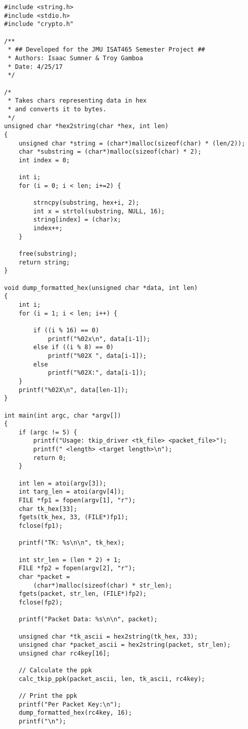 \documentclass[main.tex]{subfiles} \label{sec9}
\begin{document}
\begin{verbatim}
#include <string.h>
#include <stdio.h>
#include "crypto.h"

/**
 * ## Developed for the JMU ISAT465 Semester Project ##
 * Authors: Isaac Sumner & Troy Gamboa
 * Date: 4/25/17
 */

/*
 * Takes chars representing data in hex 
 * and converts it to bytes.
 */
unsigned char *hex2string(char *hex, int len)
{
    unsigned char *string = (char*)malloc(sizeof(char) * (len/2));
    char *substring = (char*)malloc(sizeof(char) * 2);
    int index = 0;

    int i;
    for (i = 0; i < len; i+=2) {
        
        strncpy(substring, hex+i, 2);
        int x = strtol(substring, NULL, 16);
        string[index] = (char)x;
        index++;
    }
    
    free(substring);
    return string;
}

void dump_formatted_hex(unsigned char *data, int len)
{
    int i;
    for (i = 1; i < len; i++) {
        
        if ((i % 16) == 0)
            printf("%02x\n", data[i-1]);
        else if ((i % 8) == 0)
            printf("%02X ", data[i-1]);
        else
            printf("%02X:", data[i-1]);
    }
    printf("%02X\n", data[len-1]);
}

int main(int argc, char *argv[])
{
    if (argc != 5) {
        printf("Usage: tkip_driver <tk_file> <packet_file>"); 
        printf(" <length> <target length>\n");
        return 0;
    }

    int len = atoi(argv[3]);
    int targ_len = atoi(argv[4]);
    FILE *fp1 = fopen(argv[1], "r");
    char tk_hex[33];
    fgets(tk_hex, 33, (FILE*)fp1);
    fclose(fp1);

    printf("TK: %s\n\n", tk_hex);

    int str_len = (len * 2) + 1;
    FILE *fp2 = fopen(argv[2], "r");
    char *packet = 
        (char*)malloc(sizeof(char) * str_len);
    fgets(packet, str_len, (FILE*)fp2);
    fclose(fp2);

    printf("Packet Data: %s\n\n", packet);  
    
    unsigned char *tk_ascii = hex2string(tk_hex, 33);
    unsigned char *packet_ascii = hex2string(packet, str_len);
    unsigned char rc4key[16];

    // Calculate the ppk
    calc_tkip_ppk(packet_ascii, len, tk_ascii, rc4key);
    
    // Print the ppk
    printf("Per Packet Key:\n");
    dump_formatted_hex(rc4key, 16);
    printf("\n");


\end{verbatim}
\end{document}
